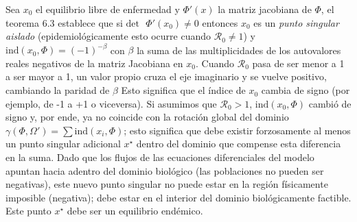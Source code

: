 \documentclass{article}
\numberwithin{equation}{section}
\begin{document}
Sea $x_0$ el equilibrio libre de enfermedad y $\Phi'(x)$ la matriz jacobiana de $\Phi$, el teorema 6.3 establece que si $\text{det}\text{ }\Phi'(x_0) \not= 0$ entonces $x_0$ es un \textit{punto singular aislado} (epidemiológicamente esto ocurre cuando $\mathcal{R}_0\not= 1$) y $\text{ind}(x_0,\Phi) = (-1)^{-\beta}$ con $\beta$ la suma de las multiplicidades de los autovalores reales negativos de la matriz Jacobiana en $x_0$. Cuando $\mathcal{R}_0$ pasa de ser menor a 1 a ser mayor a 1, un valor propio cruza el eje imaginario y se vuelve positivo, cambiando la paridad de $\beta$  Esto significa que el índice de $x_0$ cambia de signo (por ejemplo, de -1 a +1 o viceversa). Si asumimos que $\mathcal{R}_0>1$, $\text{ind}(x_0,\Phi)$ cambió de signo y, por ende, ya no coincide con la rotación global del dominio $\gamma(\Phi,\Omega') = \sum \text{ind}(x_i, \Phi)$; esto significa que debe existir forzosamente al menos un punto singular adicional $x^\star$ dentro del dominio que compense esta diferencia en la suma. Dado que los flujos de las ecuaciones diferenciales del modelo apuntan hacia adentro del dominio biológico (las poblaciones no pueden ser negativas), este nuevo punto singular no puede estar en la región físicamente imposible (negativa); debe estar en el interior del dominio biológicamente factible. Este punto $x^\star$ debe ser un equilibrio endémico. 
\end{document}
